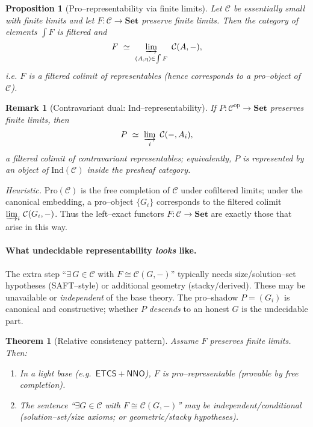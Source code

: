 \documentclass[11pt]{article}
\theoremstyle{upright}
\newtheorem{theorem}{Theorem}
\newtheorem{proposition}{Proposition}
\newtheorem{remark}{Remark}
\begin{document}
\begin{proposition}[Pro–representability via finite limits]\label{prop:pro}
Let $\mathcal C$ be essentially small with finite limits and let $F:\mathcal C\to\mathbf{Set}$ preserve finite limits. Then the category of elements $\int F$ is filtered and
\[
F \ \simeq\ \varinjlim_{(A,\eta)\in \int F}\ \mathcal C(A,-),
\]
i.e. $F$ is a \emph{filtered colimit} of representables (hence corresponds to a pro–object of $\mathcal C$). \citep{Lurie2018ProObjects}
\end{proposition}

\begin{remark}[Contravariant dual: Ind–representability]
If $P:\mathcal C^{\mathrm{op}}\!\to\!\mathbf{Set}$ preserves finite limits, then
\[
P \ \simeq\ \varinjlim_{i}\ \mathcal C(-,A_i),
\]
a filtered colimit of \emph{contravariant} representables; equivalently, $P$ is represented by an object of $\mathrm{Ind}(\mathcal C)$ inside the presheaf category.
\end{remark}

\noindent\emph{Heuristic.} $\mathrm{Pro}(\mathcal C)$ is the free completion of $\mathcal C$ under cofiltered limits; under the canonical embedding, a pro–object $\{G_i\}$ corresponds to the filtered colimit $\varinjlim_i\,\mathcal C(G_i,-)$. Thus the left–exact functors $F:\mathcal C\to\mathbf{Set}$ are exactly those that arise in this way.

\paragraph{What undecidable representability \emph{looks} like.}
The extra step ``$\exists\,G\in\mathcal C$ with $F\cong\mathcal C(G,-)$'' typically needs size/solution–set hypotheses (SAFT–style) or additional geometry (stacky/derived). These may be unavailable or \emph{independent} of the base theory. The pro–shadow $P=(G_i)$ is canonical and constructive; whether $P$ \emph{descends} to an honest $G$ is the undecidable part.

\begin{theorem}[Relative consistency pattern]\label{thm:relative}
Assume $F$ preserves finite limits. Then:
\begin{enumerate}[label=(\alph*), leftmargin=2em]
\item In a light base (e.g.\ $\mathsf{ETCS}\!+\!\mathsf{NNO}$), $F$ is pro–representable (provable by free completion).
\item The sentence “$\exists G\in\mathcal C$ with $F\cong \mathcal C(G,-)$” may be independent/conditional (solution–set/size axioms; or geometric/stacky hypotheses).
\end{enumerate}
\end{theorem}
\end{document}
